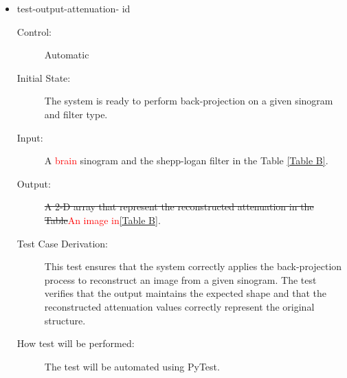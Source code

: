 \documentclass[12pt, titlepage]{article}
\newcounter{testnum}
\newcommand{\dthetestnum}{id\thetestnum}
\newcommand{\add}{\textcolor{red}}
\begin{document}
\begin{itemize}
\item{test-output-attenuation- \label{id6} \dthetestnum}
\begin{description}
\item[Control:] Automatic

\item[Initial State:] The system is ready to perform back-projection on a given
  sinogram and filter type.

\item[Input:] A \add{brain} sinogram and the shepp-logan filter in the Table \ref{Table B}.

\item[Output:] \st{A 2-D array that represent the reconstructed attenuation in the
  Table}\add{An image in}\ref{Table B}.

\item[Test Case Derivation:] This test ensures that the system correctly applies the back-projection process to reconstruct an image from a given sinogram. The test verifies that the output maintains the expected shape and that the reconstructed attenuation values correctly represent the original structure.

\item[How test will be performed:] The test will be automated using PyTest.
\end{description}
\end{itemize}
\end{document}
